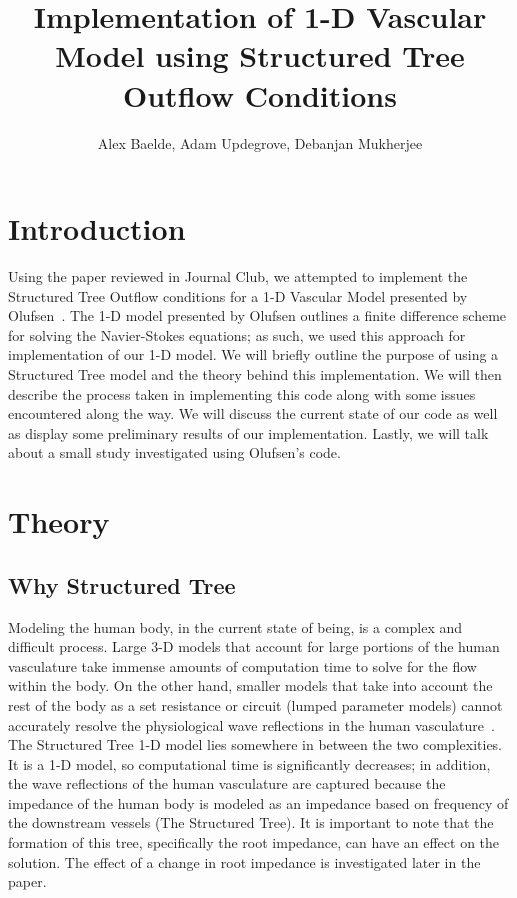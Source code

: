 \documentclass[12pt]{article}
\title{Implementation of 1-D Vascular Model using Structured Tree Outflow Conditions}
\author{Alex Baelde, Adam Updegrove, Debanjan Mukherjee}
\begin{document}
\maketitle
\section{Introduction}
Using the paper reviewed in Journal Club, we attempted to implement the Structured Tree Outflow conditions for a 1-D Vascular Model presented by Olufsen~\cite{structuredtree}. The 1-D model presented by Olufsen outlines a finite difference scheme for solving the Navier-Stokes equations; as such, we used this approach for implementation of our 1-D model. We will briefly outline the purpose of using a Structured Tree model and the theory behind this implementation.%
We will then describe the process taken in implementing this code along with some issues encountered along the way. We will discuss the current state of our code as well as display some preliminary results of our implementation. Lastly, we will talk about a small study investigated using Olufsen's code. 

\section{Theory}

\subsection{Why Structured Tree}

Modeling the human body, in the current state of being, is a complex and difficult process. Large 3-D models that account for large portions of the human vasculature take immense amounts of computation time to solve for the flow within the body. On the other hand, smaller models that take into account the rest of the body as a set resistance or circuit (lumped parameter models) cannot accurately resolve the physiological wave reflections in the human vasculature~\cite{structuredtree}. The Structured Tree 1-D model lies somewhere in between the two complexities. It is a 1-D model, so computational time is significantly decreases; in addition, the wave reflections of the human vasculature are captured because the impedance of the human body is modeled as an impedance based on frequency of the downstream vessels (The Structured Tree). It is important to note that the formation of this tree, specifically the root impedance, can have an effect on the solution. The effect of  a change in root impedance is investigated later in the paper.
\end{document}
